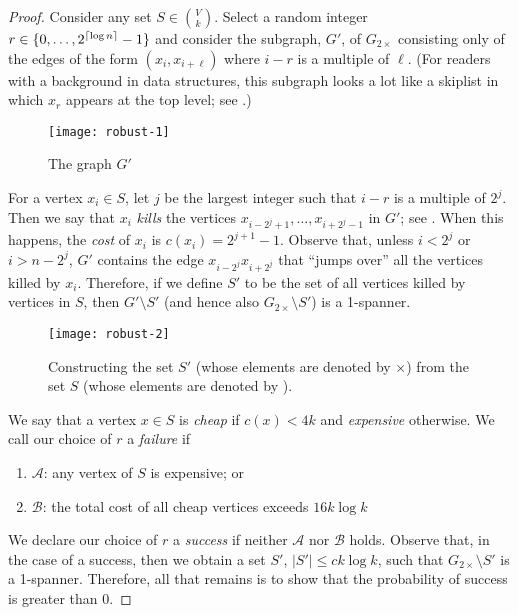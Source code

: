 \documentclass{patmorin}
\begin{document}
\begin{proof}
Consider any set $S\in\binom{V}{k}$.  Select a random integer
$r\in\{0,\ldots,2^{{\lceil \log n \rceil}}-1\}$ and consider the subgraph, $G'$, of
$G_{2\times}$ consisting only of the edges of the form $(x_i,x_{i+\ell})$
where $i-r$ is a multiple of $\ell$.  (For readers with a background in
data structures, this subgraph looks a lot like a skiplist in which $x_r$
appears at the top level; see
.)

\begin{figure}
  \begin{center}
  \texttt{[image: robust-1]}
  \end{center}
  \caption{The graph $G'$}
\end{figure}

For a vertex $x_i\in S$, let $j$ be the largest integer such that $i-r$
is a multiple of $2^j$.  Then we say that $x_i$ \emph{kills} the vertices
$x_{i-2^{j}+1},\ldots,x_{i+2^{j}-1}$ in $G'$; see .
When this happens, the \emph{cost} of $x_i$ is $c(x_i)=2^{j+1}-1$.
Observe that, unless $i<2^{j}$ or $i>n-2^{j}$, $G'$ contains the edge
$x_{i-2^{j}}x_{i+2^{j}}$ that ``jumps over'' all the vertices killed
by $x_i$.  Therefore, if we define $S'$ to be the set of all vertices
killed by vertices in $S$, then $G'\setminus S'$ (and hence also
$G_{2\times}\setminus S'$) is a 1-spanner.

\begin{figure}
  \begin{center}
  \texttt{[image: robust-2]}
  \end{center}
  \caption{Constructing the set $S'$ (whose elements are denoted by $\times$)
from the set $S$ (whose elements are denoted by \textbullet).}
\end{figure}

We say that a vertex $x\in S$ is
\emph{cheap} if $c(x) < 4k$ and \emph{expensive} otherwise.
We call our choice of $r$ a \emph{failure} if
\begin{enumerate}
  \item $\mathcal{A}$: any vertex of $S$ is expensive; or
  \item $\mathcal{B}$: the total cost of all cheap vertices exceeds $16k\log k$
\end{enumerate}
We declare our choice of $r$ a \emph{success} if neither $\mathcal{A}$
nor $\mathcal{B}$ holds.  Observe that, in the case of a success, then we
obtain a set $S'$, $|S'|\le ck\log k$, such that $G_{2\times}\setminus
S'$ is a 1-spanner.  Therefore, all that remains is to show that the
probability of success is greater than 0.


\end{proof}
\end{document}

